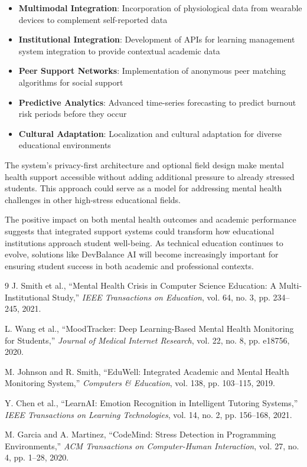 \documentclass[conference,10pt]{IEEEtran}
\begin{document}
\begin{itemize}
\item \textbf{Multimodal Integration}: Incorporation of physiological data from wearable devices to complement self-reported data
\item \textbf{Institutional Integration}: Development of APIs for learning management system integration to provide contextual academic data
\item \textbf{Peer Support Networks}: Implementation of anonymous peer matching algorithms for social support
\item \textbf{Predictive Analytics}: Advanced time-series forecasting to predict burnout risk periods before they occur
\item \textbf{Cultural Adaptation}: Localization and cultural adaptation for diverse educational environments
\end{itemize}

The system's privacy-first architecture and optional field design make mental health support accessible without adding additional pressure to already stressed students. This approach could serve as a model for addressing mental health challenges in other high-stress educational fields.

The positive impact on both mental health outcomes and academic performance suggests that integrated support systems could transform how educational institutions approach student well-being. As technical education continues to evolve, solutions like DevBalance AI will become increasingly important for ensuring student success in both academic and professional contexts.

\begin{thebibliography}{9}
J. Smith et al., ``Mental Health Crisis in Computer Science Education: A Multi-Institutional Study,'' \emph{IEEE Transactions on Education}, vol. 64, no. 3, pp. 234--245, 2021.

L. Wang et al., ``MoodTracker: Deep Learning-Based Mental Health Monitoring for Students,'' \emph{Journal of Medical Internet Research}, vol. 22, no. 8, pp. e18756, 2020.

M. Johnson and R. Smith, ``EduWell: Integrated Academic and Mental Health Monitoring System,'' \emph{Computers \& Education}, vol. 138, pp. 103--115, 2019.

Y. Chen et al., ``LearnAI: Emotion Recognition in Intelligent Tutoring Systems,'' \emph{IEEE Transactions on Learning Technologies}, vol. 14, no. 2, pp. 156--168, 2021.

M. Garcia and A. Martinez, ``CodeMind: Stress Detection in Programming Environments,'' \emph{ACM Transactions on Computer-Human Interaction}, vol. 27, no. 4, pp. 1--28, 2020.
\end{thebibliography}
\end{document}
